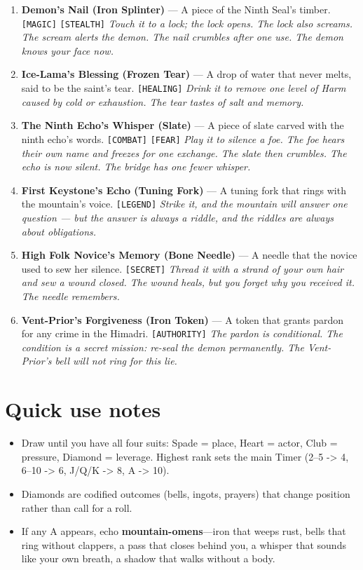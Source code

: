 \begin{enumerate}
\item \textbf{Demon's Nail (Iron Splinter)} --- A piece of the Ninth Seal's timber. \texttt{[MAGIC]} \texttt{[STEALTH]}
  \hfill \textit{Touch it to a lock; the lock opens. The lock also screams. The scream alerts the demon. The nail crumbles after one use. The demon knows your face now.}
\item \textbf{Ice-Lama's Blessing (Frozen Tear)} --- A drop of water that never melts, said to be the saint's tear. \texttt{[HEALING]}
  \hfill \textit{Drink it to remove one level of Harm caused by cold or exhaustion. The tear tastes of salt and memory.}
\item[J] \textbf{The Ninth Echo's Whisper (Slate)} --- A piece of slate carved with the ninth echo's words. \texttt{[COMBAT]} \texttt{[FEAR]}
  \hfill \textit{Play it to silence a foe. The foe hears their own name and freezes for one exchange. The slate then crumbles. The echo is now silent. The bridge has one fewer whisper.}
\item[Q] \textbf{First Keystone's Echo (Tuning Fork)} --- A tuning fork that rings with the mountain's voice. \texttt{[LEGEND]}
  \hfill \textit{Strike it, and the mountain will answer one question --- but the answer is always a riddle, and the riddles are always about obligations.}
\item[K] \textbf{High Folk Novice's Memory (Bone Needle)} --- A needle that the novice used to sew her silence. \texttt{[SECRET]}
  \hfill \textit{Thread it with a strand of your own hair and sew a wound closed. The wound heals, but you forget why you received it. The needle remembers.}
\item[A] \textbf{Vent-Prior's Forgiveness (Iron Token)} --- A token that grants pardon for any crime in the Himadri. \texttt{[AUTHORITY]}
  \hfill \textit{The pardon is conditional. The condition is a secret mission: re-seal the demon permanently. The Vent-Prior's bell will not ring for this lie.}
\end{enumerate}

\section*{Quick use notes}
\label{sec:himadri-quick-use}
\begin{itemize}
\item Draw until you have all four suits: Spade = place, Heart = actor, Club = pressure, Diamond = leverage. Highest rank sets the main Timer (2--5 -> 4, 6--10 -> 6, J/Q/K -> 8, A -> 10).
\item Diamonds are codified outcomes (bells, ingots, prayers) that change position rather than call for a roll.
\item If any A appears, echo \textbf{mountain-omens}---iron that weeps rust, bells that ring without clappers, a pass that closes behind you, a whisper that sounds like your own breath, a shadow that walks without a body.
\end{itemize}

